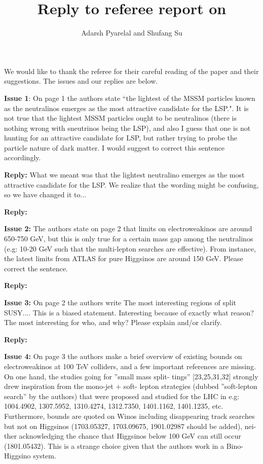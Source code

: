 \documentclass{article}
\title{Reply to referee report on \verbatim{JHEP_111P_0819}}
\author{Adarsh Pyarelal and Shufang Su}
\begin{document}
\maketitle

We would like to thank the referee for their careful reading of the paper and their 
suggestions. The issues and our replies are below.

\noindent \textbf{Issue 1}: On page 1 the authors state ``the lightest of the
MSSM particles known as the neutralinos emerges as the most attractive
candidate for the LSP.". It is not true that the lightest MSSM particles ought
to be neutralinos (there is nothing wrong with sneutrinos being the LSP), and
also I guess that one is not hunting for an attractive candidate for LSP, but
rather trying to probe the particle nature of dark matter. I would suggest to
correct this sentence accordingly.

\noindent\textbf{Reply:} What we meant was that the lightest neutralino
emerges as the most attractive candidate for the LSP. We realize that the
wording might be confusing, so we have changed it to...

\noindent\textbf{Reply:} 

\noindent\textbf{Issue 2:} The authors state on page 2 that limits on
electroweakinos are around 650-750 GeV, but this is only true for a certain
mass gap among the neutralinos (e.g: 10-20 GeV such that the multi-lepton
searches are effective). From instance, the latest limits from ATLAS for pure
Higgsinos are around 150 GeV. Please correct the sentence.

\noindent\textbf{Reply:} 

\noindent\textbf{Issue 3:} On page 2 the authors write The most interesting
regions of split SUSY....  This is a biased statement. Interesting because of
exactly what reason? The most interesting for who, and why? Please explain
and/or clarify.

\noindent\textbf{Reply:} 

\noindent\textbf{Issue 4:} On page 3 the authors make a brief overview of
existing bounds on electroweakinos at 100 TeV colliders, and a few important
references are missing. On one hand, the studies going for ”small mass split-
tings” [23,25,31,32] strongly drew inspiration from the mono-jet + soft- lepton
strategies (dubbed ”soft-lepton search” by the authors) that were proposed and
studied for the LHC in e.g: 1004.4902, 1307.5952, 1310.4274, 1312.7350,
1401.1162, 1401.1235, etc. Furthermore, bounds are quoted on Winos including
disappearing track searches but not on Higgsinos (1703.05327, 1703.09675,
1901.02987 should be added), nei- ther acknowledging the chance that Higgsinos
below 100 GeV can still occur (1801.05432). This is a strange choice given that
the authors work in a Bino-Higgsino system.
\end{document}
